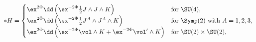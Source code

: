 \begin{equation}
\label{calib1}
   * H = \begin{cases} 
      \ex^{2\Phi} \dd \left( \ex^{-2\Phi}
          \tfrac{1}{2}J\wedge J \wedge K \right) 
             & \text{for $\SU(4)$} , \\ 
      \ex^{2\Phi} \dd \left( \ex^{-2\Phi}
          \tfrac{1}{2}J^A\wedge J^A \wedge K \right) 
             & \text{for $\Symp(2)$ with $A=1,2,3$} , \\ 
      \ex^{2\Phi} \dd \left( \ex^{-2\Phi}\vol\wedge K
          + \ex^{-2\Phi}\vol'\wedge K \right) 
             & \text{for $\SU(2)\times\SU(2)$} , \\ 
      \end{cases}
\end{equation}

